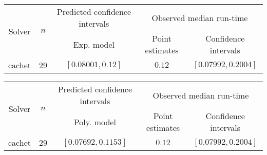\begin{tabular}{ccccc}
\hline 
\multirow{2}{*}{Solver} & \multirow{2}{*}{$n$} & Predicted confidence intervals & \multicolumn{2}{c}{Observed median  run-time}\tabularnewline
 &  & Exp. model  & Point estimates  & Confidence intervals\tabularnewline
\hline 
\hline 
\multirow{0}{*}{cachet} & 29 & $\mathbf{\left[0.08001,0.12\right]}$ & $0.12$ & $\left[0.07992,0.2004\right]$ \tabularnewline 
\hline 
\end{tabular} 

\begin{tabular}{ccccc}
\hline 
\multirow{2}{*}{Solver} & \multirow{2}{*}{$n$} & Predicted confidence intervals & \multicolumn{2}{c}{Observed median  run-time}\tabularnewline
 &  & Poly. model  & Point estimates  & Confidence intervals\tabularnewline
\hline 
\hline 
\multirow{0}{*}{cachet} & 29 & $\mathbf{\left[0.07692,0.1153\right]}$ & $0.12$ & $\left[0.07992,0.2004\right]$ \tabularnewline 
\hline 
\end{tabular} 


